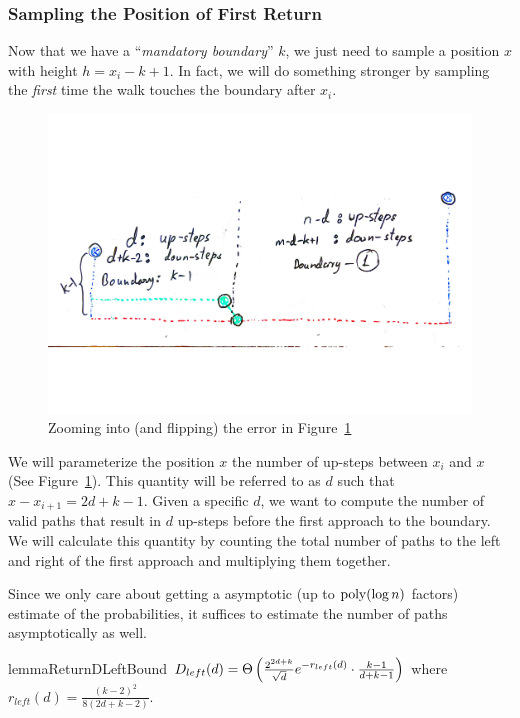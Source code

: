 \subsubsection{Sampling the Position of First Return}%
\label{sec:sampling_the_location_of_first_return}
Now that we have a ``\emph{mandatory boundary}'' $k$, we just need to sample a position $x$ with height $h = x_i-k+1$.
In fact, we will do something stronger by sampling the \emph{first} time the walk touches the boundary after $x_i$.
\begin{figure}[htpb]
    \centering
    \includegraphics[width=1.0\linewidth, trim={0 6cm 0 5cm}]{images/dyck_return_sampling.pdf}
    \caption{Zooming into (and flipping) the error in Figure~\ref{fig:dyck_return_sampling}}
    \label{fig:dyck_return_sampling}
\end{figure}

We will parameterize the position $x$ the number of up-steps between $x_i$ and $x$
(See Figure~\ref{fig:dyck_return_sampling}).
This quantity will be referred to as $d$ such that $x - x_{i+1} = 2d + k-1$.
Given a specific $d$, we want to compute the number of valid paths that result in
$d$ up-steps before the first approach to the boundary.
We will calculate this quantity by counting the total number of paths to the left and right
of the first approach and multiplying them together.

Since we only care about getting a asymptotic (up to $\mathrm{poly}(\log n)$ factors) estimate of the probabilities,
it suffices to estimate the number of paths asymptotically as well.

\begin{restatable}{lemma}{ReturnDLeftBound}
\label{lem:ReturnDLeftBound}
$D_{left}(d) = \Theta\left( \frac{2^{2d+k}}{\sqrt{d}}\mathlarger e^{-r_{left}(d)}\cdot \frac{k-1}{d+k-1}\right)$
where $r_{left}(d) = \frac{(k-2)^2}{8(2d+k-2)}$.
\end{restatable}

